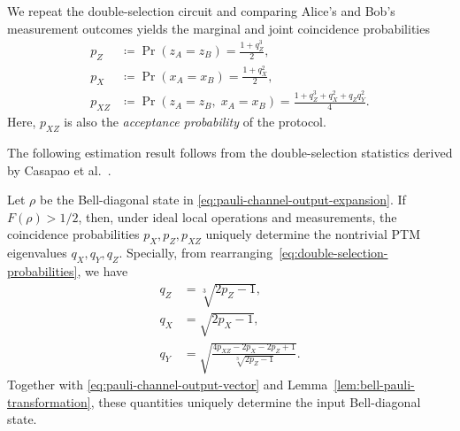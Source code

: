 We repeat the double-selection circuit and comparing Alice's and Bob's
measurement outcomes yields the marginal and joint coincidence
probabilities
\begin{equation}
    \begin{aligned}
        p_Z
         & \coloneqq \Pr(z_A=z_B)
        =\frac{1+q_Z^3}{2},       \\
        p_X
         & \coloneqq \Pr(x_A=x_B)
        =\frac{1+q_X^2}{2},       \\
        p_{XZ}
         & \coloneqq
        \Pr(z_A=z_B,\;x_A=x_B)=\frac{1+q_Z^3+q_X^2+q_Zq_Y^2}{4}.
    \end{aligned}
    \label{eq:double-selection-probabilities}
\end{equation}
Here, \(p_{XZ}\) is also the \emph{acceptance probability} of the protocol.

The following estimation result follows from the double-selection statistics derived by Casapao et al.~\citep[Sec.~III-A]{Casapao_2025}.

\begin{lemma}
    \label{lem:double-selection-statistics}
    Let \(\rho\) be the Bell-diagonal state in
    \eqref{eq:pauli-channel-output-expansion}. If
    \(F(\rho)>1/2\), then, under ideal local operations and measurements,
    the coincidence probabilities \(p_X,p_Z,p_{XZ}\) uniquely determine
    the nontrivial PTM eigenvalues \(q_X,q_Y,q_Z\).
    Specially, from rearranging~\eqref{eq:double-selection-probabilities}, we have
    \begin{equation}
        \begin{aligned}
            q_Z
             & =\sqrt[3]{2p_Z-1}, \\
            q_X
             & =\sqrt{2p_X-1},    \\
            q_Y
             & =
            \sqrt{
                \frac{
                    4p_{XZ}-2p_X-2p_Z+1
                }{
                    \sqrt[3]{2p_Z-1}
                }
            }.
        \end{aligned}
        \label{eq:double-selection-inversion}
    \end{equation}
    Together with
    \eqref{eq:pauli-channel-output-vector} and
    Lemma~\ref{lem:bell-pauli-transformation}, these quantities uniquely
    determine the input Bell-diagonal state.
\end{lemma}




